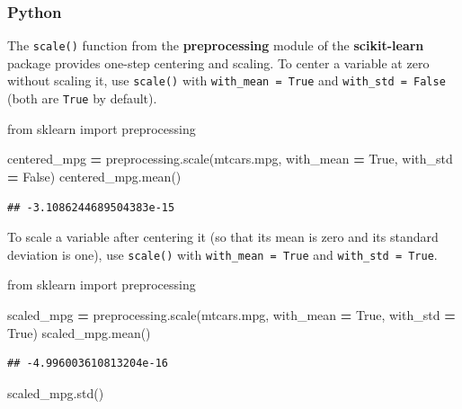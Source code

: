 \documentclass[
]{book}
\newenvironment{Shaded}{\begin{snugshade}}{\end{snugshade}}
\newcommand{\ImportTok}[1]{#1}
\newcommand{\NormalTok}[1]{#1}
\newcommand{\OperatorTok}[1]{\textcolor[rgb]{0.81,0.36,0.00}{\textbf{#1}}}
\newcommand{\VariableTok}[1]{\textcolor[rgb]{0.00,0.00,0.00}{#1}}
\begin{document}
\hypertarget{python-40}{%
\subsubsection*{Python}\label{python-40}}

The \texttt{scale()} function from the \textbf{preprocessing} module of the \textbf{scikit-learn} package provides one-step centering and scaling. To center a variable at zero without scaling it, use \texttt{scale()} with \texttt{with\_mean\ =\ True} and \texttt{with\_std\ =\ False} (both are \texttt{True} by default).

\begin{Shaded}
\begin{Highlighting}[]
\ImportTok{from}\NormalTok{ sklearn }\ImportTok{import}\NormalTok{ preprocessing}

\NormalTok{centered\_mpg }\OperatorTok{=}\NormalTok{ preprocessing.scale(mtcars.mpg, with\_mean }\OperatorTok{=} \VariableTok{True}\NormalTok{, with\_std }\OperatorTok{=} \VariableTok{False}\NormalTok{)}
\NormalTok{centered\_mpg.mean()}
\end{Highlighting}
\end{Shaded}

\begin{verbatim}
## -3.1086244689504383e-15
\end{verbatim}

To scale a variable after centering it (so that its mean is zero and its standard deviation is one), use \texttt{scale()} with \texttt{with\_mean\ =\ True} and \texttt{with\_std\ =\ True}.

\begin{Shaded}
\begin{Highlighting}[]
\ImportTok{from}\NormalTok{ sklearn }\ImportTok{import}\NormalTok{ preprocessing}

\NormalTok{scaled\_mpg }\OperatorTok{=}\NormalTok{ preprocessing.scale(mtcars.mpg, with\_mean }\OperatorTok{=} \VariableTok{True}\NormalTok{, with\_std }\OperatorTok{=} \VariableTok{True}\NormalTok{)}
\NormalTok{scaled\_mpg.mean()}
\end{Highlighting}
\end{Shaded}

\begin{verbatim}
## -4.996003610813204e-16
\end{verbatim}

\begin{Shaded}
\begin{Highlighting}[]
\NormalTok{scaled\_mpg.std()}
\end{Highlighting}
\end{Shaded}
\end{document}
